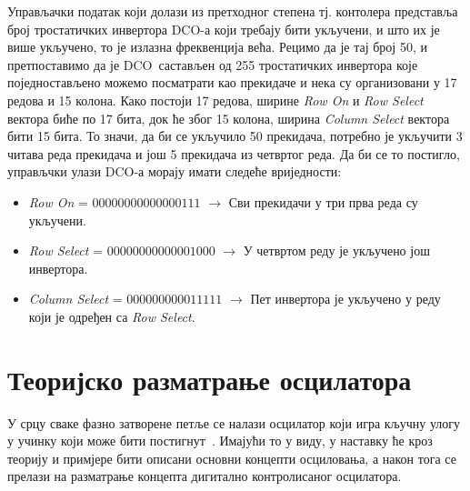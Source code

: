 \documentclass[master]{finthesis}
\def \DCO  {DCO} %
\begin{document}
Управљачки податак који долази из претходног степена тј. контолера представља број тростатичких инвертора \DCO-а који требају бити укључени, и што их је више укључено, то је излазна фреквенција већа. Рецимо да је тај број 50, и претпоставимо да је \DCO\ састављен од 255 тростатичких инвертора које поједностављено можемо посматрати као прекидаче и нека су организовани у 17 редова и 15 колона. Како постоји 17 редова, ширине \textit{Row On} и \textit{Row Select} вектора биће по 17 бита, док ће због 15 колона, ширина \textit{Column Select} вектора бити 15 бита. То значи, да би се укључило 50 прекидача, потребно је укључити 3 читава реда прекидача и још 5 прекидача из четвртог реда. Да би се то постигло, управљчки улази \DCO-а морају имати следеће вриједности:
\begin{itemize}
	\item \textit{Row On} = $00000000000000111$ $\rightarrow$ Сви прекидачи у три прва реда су укључени. 
	\item \textit{Row Select} = $00000000000001000$ $\rightarrow$ У четвртом реду је укључено још инвертора.
	\item \textit{Column Select} = $000000000011111$ $\rightarrow$ Пет инвертора је укључено у реду који је одређен са \textit{Row Select}.
\end{itemize}

\section{Теоријско разматрање осцилатора} \label{Oscillation basics}
У срцу сваке фазно затворене петље се налази осцилатор који игра кључну улогу у учинку који може бити постигнут~\cite{Razavi:PLL_CMOS_2020}. Имајући то у виду, у наставку ће кроз теорију и примјере бити описани основни концепти осциловања, а након тога се прелази на разматрање концепта дигитално контролисаног осцилатора. \par
\end{document}

